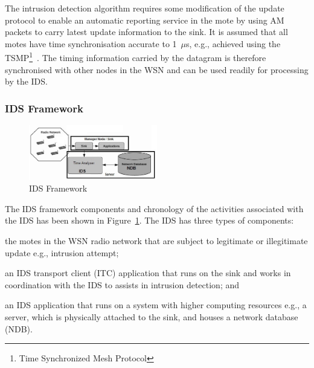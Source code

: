 \documentclass[conference,manuscript]{IEEEtran}
\begin{document}
The intrusion detection algorithm requires some modification of the update protocol to enable an automatic reporting service in the mote by using AM packets to carry latest update information to the sink.
It is assumed that all motes have time synchronisation accurate to 1~$\mu$s, e.g., achieved using the TSMP\footnote{Time Synchronized Mesh Protocol}~\cite{Pister08tsmp:time}.
The timing information carried by the datagram is therefore synchronised with other nodes in the WSN and can be used readily for processing by the IDS.

\subsubsection*{IDS Framework}
\label{ssc:ids_fw}
\begin{figure}[btp]
    \centering
    \includegraphics[width=0.5\textwidth]{IDS_fw}	
    \caption{IDS Framework}
    \label{fig:ids_fw}
\end{figure}
The IDS framework components and chronology of the activities associated with the IDS has been shown in Figure~\ref{fig:ids_fw}.
The IDS has three types of components:
\begin{inparaenum}
\item the motes in the WSN radio network that are subject to legitimate or illegitimate update e.g., intrusion attempt; 
\item an IDS transport client (ITC) application that runs on the sink and works in coordination with the IDS to assists in intrusion detection; and
\item an IDS application that runs on a system with higher computing resources e.g., a server, which is physically attached to the sink, and houses a network database (NDB).
\end{inparaenum}
\end{document}
